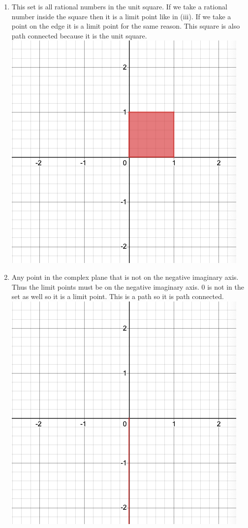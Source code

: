\documentclass{article}
\begin{document}
\begin{enumerate}
\begin{enumerate}[label=\roman*]
        \item
          This set is all rational numbers in the unit square. If we take a rational number inside the square then it is a limit point like in (iii). If we take a point on the edge it is a limit point for the same reason. This square is also path connected because it is the unit square.\\
          \includegraphics[scale=0.5]{graphs/v}
        \item
          Any point in the complex plane that is not on the negative imaginary axis. Thus the limit points must be on the negative imaginary axis. 0 is not in the set as well so it is a limit point. This is a path so it is path connected.\\
          \includegraphics[scale=0.5]{graphs/vi}

\end{enumerate}
\end{enumerate}
\end{document}
